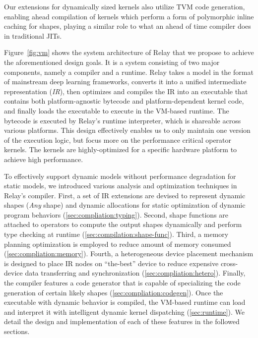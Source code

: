 Our extensions for dynamically sized kernels also utilize TVM code generation, enabling
ahead compilation of kernels which perform a form of polymorphic inline caching for shapes,
playing a similar role to what an ahead of time compiler does in traditional JITs.

Figure~\ref{fig:vm} shows the system architecture of Relay that we propose to achieve the aforementioned design goals.
It is a system consisting of two major components, namely a compiler and a runtime.
Relay takes a model in the format of mainstream deep learning frameworks, converts it into a unified intermediate representation (\textit{IR}), then optimizes and compiles the IR into an executable that contains both platform-agnostic bytecode and platform-dependent kernel code, and finally loads the executable to execute in the VM-based runtime.
The bytecode is executed by Relay's runtime interpreter, which is shareable across various platforms.
This design effectively enables us to only maintain one version of the execution logic, but focus more on the performance critical operator kernels.
The kernels are highly-optimized for a specific hardware platform to achieve high performance.

To effectively support dynamic models without performance degradation for static models, we introduced various analysis and optimization techniques in Relay's compiler.
First, a set of IR extensions are devised to represent dynamic shapes (\textit{Any} shape) and dynamic allocations for static optimization of dynamic program behaviors (\autoref{sec:compliation:typing}).
Second, shape functions are attached to operators to compute the output shapes dynamically and perform type checking at runtime (\autoref{sec:compilation:shape-func}).
Third, a memory planning optimization is employed to reduce amount of memory consumed (\autoref{sec:compliation:memory}).
Fourth, a heterogeneous device placement mechanism is designed to place IR nodes on ``the-best'' device to reduce expensive cross-device data transferring and synchronization (\autoref{sec:compliation:hetero}).
Finally, the compiler features a code generator that is capable of specializing the code generation of certain likely shapes (\autoref{sec:compliation:codegen}). Once the executable with dynamic behavior is compiled, the VM-based runtime can load and interpret it with intelligent dynamic kernel dispatching (\autoref{sec:runtime}). We detail the design and implementation of each of these features in the followed sections.


